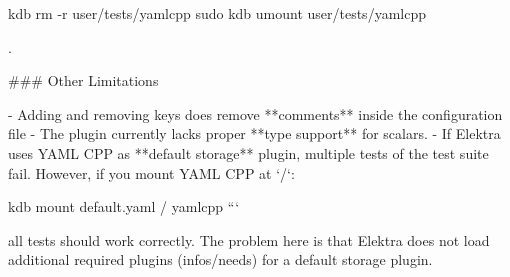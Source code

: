 kdb rm -\/r user/tests/yamlcpp sudo kdb umount user/tests/yamlcpp 
\begin{DoxyCode}
.

### Other Limitations

- Adding and removing keys does remove **comments** inside the configuration file
- The plugin currently lacks proper **type support** for scalars.
- If Elektra uses YAML CPP as **default storage** plugin, multiple tests of the test suite fail. However,
       if you mount YAML CPP at `/`:
\end{DoxyCode}
 kdb mount default.\+yaml / yamlcpp ```

all tests should work correctly. The problem here is that Elektra does not load additional required plugins ({\ttfamily infos/needs}) for a default storage plugin. 